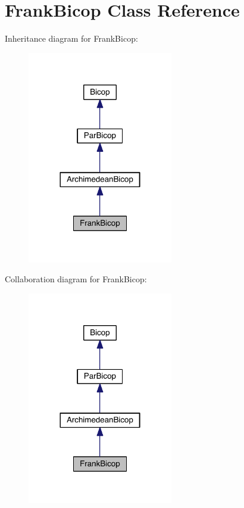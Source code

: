 \hypertarget{class_frank_bicop}{}\section{Frank\+Bicop Class Reference}
\label{class_frank_bicop}


Inheritance diagram for Frank\+Bicop\+:
\nopagebreak
\begin{figure}[H]
\begin{center}
\leavevmode
\includegraphics[width=180pt]{class_frank_bicop__inherit__graph}
\end{center}
\end{figure}


Collaboration diagram for Frank\+Bicop\+:
\nopagebreak
\begin{figure}[H]
\begin{center}
\leavevmode
\includegraphics[width=180pt]{class_frank_bicop__coll__graph}
\end{center}
\end{figure}
